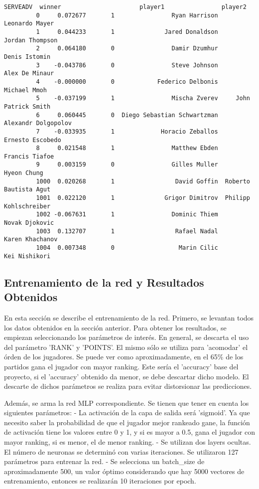 \documentclass[11pt]{article}
\begin{document}
\begin{Verbatim}[commandchars=\\\{\}]
               SERVEADV  winner                      player1                player2  
         0     0.072677       1                Ryan Harrison         Leonardo Mayer  
         1     0.044233       1              Jared Donaldson        Jordan Thompson  
         2     0.064180       0                Damir Dzumhur          Denis Istomin  
         3    -0.043786       0                Steve Johnson         Alex De Minaur  
         4    -0.000000       0            Federico Delbonis           Michael Mmoh  
         5    -0.037199       1                Mischa Zverev     John Patrick Smith  
         6     0.060445       0  Diego Sebastian Schwartzman    Alexandr Dolgopolov  
         7    -0.033935       1             Horacio Zeballos       Ernesto Escobedo  
         8     0.021548       1                Matthew Ebden         Francis Tiafoe  
         9     0.003159       0                Gilles Muller            Hyeon Chung  
         1000  0.020268       1                 David Goffin  Roberto Bautista Agut  
         1001  0.022120       1              Grigor Dimitrov  Philipp Kohlschreiber  
         1002 -0.067631       1                Dominic Thiem         Novak Djokovic  
         1003  0.132707       1                 Rafael Nadal        Karen Khachanov  
         1004  0.007348       0                  Marin Cilic          Kei Nishikori  
\end{Verbatim}
            
    \subsection{Entrenamiento de la red y Resultados
Obtenidos}\label{entrenamiento-de-la-red-y-resultados-obtenidos}

En esta sección se describe el entrenamiento de la red. Primero, se
levantan todos los datos obtenidos en la sección anterior. Para obtener
los resultados, se empiezan seleccionando los parámetros de interés. En
general, se descarta el uso del parámetro 'RANK' y 'POINTS'. El mismo
sólo se utiliza para 'acomodar' el órden de los jugadores. Se puede ver
como aproximadamente, en el 65\% de los partidos gana el jugador con
mayor ranking. Este sería el 'accuracy' base del proyecto, si el
'accuracy' obtenido da menor, se debe descartar dicho modelo. El
descarte de dichos parámetros se realiza para evitar distorsionar las
predicciones.

Además, se arma la red MLP correspondiente. Se tienen que tener en
cuenta los siguientes parámetros: - La activación de la capa de salida
será 'sigmoid'. Ya que necesito saber la probabilidad de que el jugador
mejor rankeado gane, la función de activación tiene los valores entre 0
y 1, y si es mayor a 0.5, gana el jugador con mayor ranking, si es
menor, el de menor ranking. - Se utilizan dos layers ocultas. El número
de neuronas se determinó con varias iteraciones. Se utilizaron 127
parámetros para entrenar la red. - Se selecciona un batch\_size de
aproximadamente 500, un valor óptimo considerando que hay 5000 vectores
de entrenamiento, entonces se realizarán 10 iteraciones por epoch.
\end{document}
